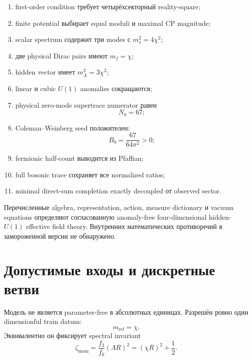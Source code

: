 \begin{enumerate}
 \item first-order condition требует четырёхсекторный reality-square;
 \item finite potential выбирает equal moduli и maximal CP magnitude;
 \item scalar spectrum содержит три modes с
 \(m_s^2=4\chi^2\);
 \item две physical Dirac pairs имеют \(m_f=\chi\);
 \item hidden vector имеет \(m_A^2=3\chi^2\);
 \item linear и cubic \(U(1)\) anomalies сокращаются;
 \item physical zero-mode supertrace numerator равен
 \begin{equation}
  N_0=67;
 \end{equation}
 \item Coleman--Weinberg seed положителен:
 \begin{equation}
  B_0=\frac{67}{64\pi^2}>0;
 \end{equation}
 \item fermionic half-count выводится из Pfaffian;
 \item full bosonic trace сохраняет все normalized ratios;
 \item minimal direct-sum completion exactly decoupled от observed sector.
\end{enumerate}

\begin{theorem}
Перечисленные algebra, representation, action, measure dictionary и
vacuum equations определяют согласованную anomaly-free
four-dimensional hidden-\(U(1)\) effective field theory. Внутренних
математических противоречий в замороженной версии не обнаружено.
\end{theorem}

\section{Допустимые входы и дискретные ветви}

Модель не является parameter-free в абсолютных единицах. Разрешён ровно
один dimensionful train datum:
\begin{equation}
 m_{\mathrm{ref}}=\chi.
\end{equation}
Эквивалентно он фиксирует spectral invariant
\begin{equation}
 \zeta_{\mathrm{mom}}
 =
 \frac{f_2}{f_0}(\Lambda R)^2
 =
 (\chi R)^2+\frac12.
\end{equation}

